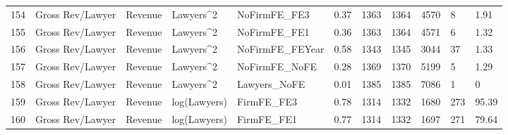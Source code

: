 \documentclass{article}
\begin{document}
\begin{table}[H]
\begin{tabular}{rllllllllll}
  154 & Gross Rev/Lawyer & Revenue & Lawyers^2 & NoFirmFE\_FE3 & 0.37 & 1363 & 1364 & 4570 & 8 & 1.91 \\ 
  155 & Gross Rev/Lawyer & Revenue & Lawyers^2 & NoFirmFE\_FE1 & 0.36 & 1363 & 1364 & 4571 & 6 & 1.32 \\ 
  156 & Gross Rev/Lawyer & Revenue & Lawyers^2 & NoFirmFE\_FEYear & 0.58 & 1343 & 1345 & 3044 & 37 & 1.33 \\ 
  157 & Gross Rev/Lawyer & Revenue & Lawyers^2 & NoFirmFE\_NoFE & 0.28 & 1369 & 1370 & 5199 & 5 & 1.29 \\ 
  158 & Gross Rev/Lawyer & Revenue & Lawyers^2 & Lawyers\_NoFE & 0.01 & 1385 & 1385 & 7086 & 1 & 0 \\ 
  159 & Gross Rev/Lawyer & Revenue & log(Lawyers) & FirmFE\_FE3 & 0.78 & 1314 & 1332 & 1680 & 273 & 95.39 \\ 
  160 & Gross Rev/Lawyer & Revenue & log(Lawyers) & FirmFE\_FE1 & 0.77 & 1314 & 1332 & 1697 & 271 & 79.64 \\ 
   \hline
\end{tabular}
\end{table}
\end{document}
